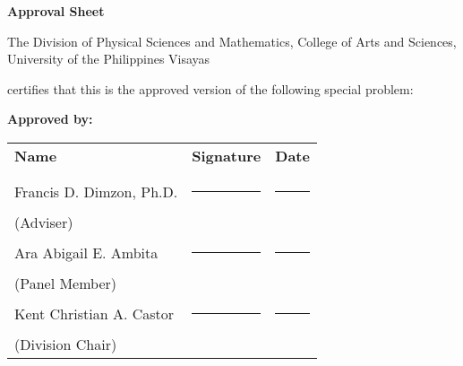 \begin{center}
	\textbf{Approval Sheet}
	
	The Division of Physical Sciences and Mathematics, College of Arts and Sciences, University of the Philippines Visayas 
	
	certifies that this is the approved version of the following special problem:
	
\end{center}

{\small\textbf{Approved by:}}

\newcommand{\signaturerule}{\rule{10em}{.4pt}}
\begin{tabular}{lll}
	\bfseries Name  & \bfseries Signature & \bfseries Date\\ \\
	Francis D. Dimzon, Ph.D. &\signaturerule  & \signaturerule\\ 
	\multicolumn{1}{l}{(Adviser)} \\ 
	Ara Abigail E. Ambita &\signaturerule &\signaturerule\\
	\multicolumn{1}{l}{(Panel Member)}  \\
	Kent Christian A. Castor &\signaturerule &\signaturerule\\
	\multicolumn{1}{l}{(Division Chair)}
	
\end{tabular}

